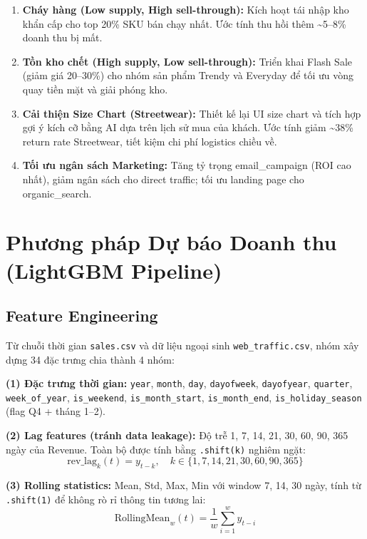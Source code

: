 \documentclass{article}
\begin{document}
\begin{enumerate}[noitemsep]
    \item \textbf{Cháy hàng (Low supply, High sell-through):} Kích hoạt tái nhập kho khẩn cấp cho top 20\% SKU bán chạy nhất. Ước tính thu hồi thêm \textasciitilde 5--8\% doanh thu bị mất.
    \item \textbf{Tồn kho chết (High supply, Low sell-through):} Triển khai Flash Sale (giảm giá 20--30\%) cho nhóm sản phẩm Trendy và Everyday để tối ưu vòng quay tiền mặt và giải phóng kho.
    \item \textbf{Cải thiện Size Chart (Streetwear):} Thiết kế lại UI size chart và tích hợp gợi ý kích cỡ bằng AI dựa trên lịch sử mua của khách. Ước tính giảm \textasciitilde 38\% return rate Streetwear, tiết kiệm chi phí logistics chiều về.
    \item \textbf{Tối ưu ngân sách Marketing:} Tăng tỷ trọng email\_campaign (ROI cao nhất), giảm ngân sách cho direct traffic; tối ưu landing page cho organic\_search.
\end{enumerate}

\section{Phương pháp Dự báo Doanh thu (LightGBM Pipeline)}

\subsection{Feature Engineering}

Từ chuỗi thời gian \texttt{sales.csv} và dữ liệu ngoại sinh \texttt{web\_traffic.csv}, nhóm xây dựng 34 đặc trưng chia thành 4 nhóm:

\textbf{(1) Đặc trưng thời gian:} \texttt{year}, \texttt{month}, \texttt{day}, \texttt{dayofweek}, \texttt{dayofyear}, \texttt{quarter}, \texttt{week\_of\_year}, \texttt{is\_weekend}, \texttt{is\_month\_start}, \texttt{is\_month\_end}, \texttt{is\_holiday\_season} (flag Q4 + tháng 1--2).

\textbf{(2) Lag features (tránh data leakage):} Độ trễ 1, 7, 14, 21, 30, 60, 90, 365 ngày của Revenue. Toàn bộ được tính bằng \texttt{.shift(k)} nghiêm ngặt:
\begin{equation}
    \text{rev\_lag}_{k}(t) = y_{t-k}, \quad k \in \{1, 7, 14, 21, 30, 60, 90, 365\}
\end{equation}

\textbf{(3) Rolling statistics:} Mean, Std, Max, Min với window 7, 14, 30 ngày, tính từ \texttt{.shift(1)} để không rò rỉ thông tin tương lai:
\begin{equation}
    \text{RollingMean}_{w}(t) = \frac{1}{w}\sum_{i=1}^{w} y_{t-i}
\end{equation}
\end{document}
